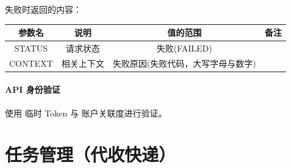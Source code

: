 \documentclass[UTF8]{article}
\def\apiauth{\paragraph{\colorbox[rgb]{0.45,0.9,1}{API 身份验证}}} %
\def\失败{\colorbox[rgb]{1,0.5,0.5}{失败}}
\def\失败V{失败(FAILED)}
\def\失败原因{失败原因(失败代码，大写字母与数字)}
\begin{document}
    \par \失败 时返回的内容：\\
    \begin{tabular}{|c|c|c|c|}
        \hline \rule[-2ex]{0pt}{5.5ex} 参数名 & 说明 & 值的范围 & 备注 \\
        \hline \rule[-2ex]{0pt}{5.5ex} STATUS & 请求状态 & \失败V &  \\ 
        \hline \rule[-2ex]{0pt}{5.5ex} CONTEXT & 相关上下文 & \失败原因 &  \\
        \hline 
    \end{tabular}
    \apiauth
    使用 临时 Token 与 账户关联度进行验证。
    
    \section{任务管理（代收快递）}
\end{document}
